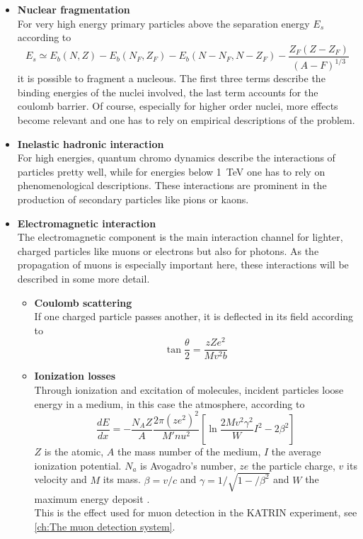     \begin{itemize}
    	\item {\bf Nuclear fragmentation}\\
    	For very high energy primary particles above the separation energy $E_s$ according to 
		\begin{equation}
			E_s \simeq E_b(N,Z) - E_b(N_F, Z_F) - E_b(N - N_F, N - Z_F) - \frac{Z_F(Z -Z_F)}{(A-F)^{1/3}}
		\end{equation}
		it is possible to fragment a nucleous. The first three terms describe the binding energies of the nuclei involved, the last term accounts for the coulomb barrier. Of course, especially for higher order nuclei, more effects become relevant and one has to rely on empirical descriptions of the problem.
		\item{\bf Inelastic hadronic interaction}\\
		For high energies, quantum chromo dynamics describe the interactions of particles pretty well, while for energies below \SI{1}{\TeV} one has to rely on phenomenological descriptions. These interactions are prominent in the production of secondary particles like pions or kaons.
		
		\item{\bf Electromagnetic interaction}\\
		The electromagnetic component is the main interaction channel for lighter, charged particles like muons or electrons but also for photons. As the propagation of muons is especially important here, these interactions will be described in some more detail.
	
	
	\begin{itemize}
		\item {\bf Coulomb scattering}\\
		If one charged particle passes another, it is deflected in its field according to
		\begin{equation}
			\tan{\frac{\theta}{2}} = \frac{zZe^2}{Mv^2b}
		\end{equation}
		\item{\bf Ionization losses}\\
		Through ionization and excitation of molecules, incident particles loose energy in a medium, in this case the atmosphere, according to
		\begin{equation}
			\frac{dE}{dx} = -\frac{N_AZ}{A}\frac{2\pi\left(ze^2\right)^2}{M'nu^2}\left[\ln{\frac{2Mv^2\gamma^2}W{I^2}}-2\beta^2\right]
		\end{equation}
		$Z$ is the atomic, $A$ the mass number of the medium, $I$ the average ionization potential. $N_a$ is Avogadro's number, $ze$ the particle charge, $v$ its velocity and $M$ its mass. $\beta = v/c$ and $\gamma = 1/\sqrt{1-/\beta^2}$ and $W$ the maximum energy deposit \cite{Hayakawa}.\\
		This is the effect used for muon detection in the KATRIN experiment, see \ref{ch:The muon detection system}.
		

\end{itemize}
\end{itemize}
